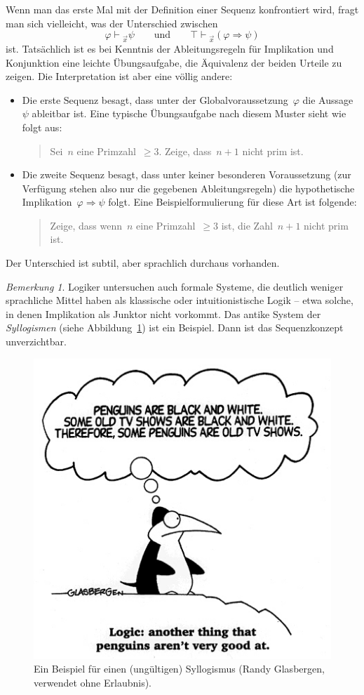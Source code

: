 \documentclass[a4paper,ngerman,12pt]{scrartcl}
\theoremstyle{definition}
\theoremstyle{plain}
\theoremstyle{remark}
\newtheorem{bem}[defn]{Bemerkung}
\newcommand{\seq}[1]{\mathrel{\vdash\!\!\!_{#1}}}
\renewcommand{\_}{\mathpunct{.}\,}
\newcommand{\?}{\,{:}\,}
\begin{document}
Wenn man das erste Mal mit der Definition einer Sequenz konfrontiert wird,
fragt man sich vielleicht, was der Unterschied zwischen
\[ \text{$\varphi \seq{\vec x} \psi$} \qquad\text{und}\qquad
  \text{$\top \seq{\vec x} (\varphi \Rightarrow \psi)$} \]
ist. Tatsächlich ist es bei Kenntnis der Ableitungsregeln für Implikation und
Konjunktion eine leichte Übungsaufgabe, die Äquivalenz der beiden Urteile zu
zeigen. Die Interpretation ist aber eine völlig andere:
\begin{itemize}
\item Die erste Sequenz besagt, dass unter der Globalvoraussetzung~$\varphi$
die Aussage~$\psi$ ableitbar ist. Eine typische Übungsaufgabe nach diesem
Muster sieht wie folgt aus:
\begin{quote}Sei~$n$ eine Primzahl~$\geq 3$. Zeige, dass~$n + 1$ nicht prim
ist.\end{quote}
\item Die zweite Sequenz besagt, dass unter keiner besonderen Voraussetzung
(zur Verfügung stehen also nur die gegebenen Ableitungsregeln) die
hypothetische Implikation~$\varphi \Rightarrow \psi$ folgt. Eine
Beispielformulierung für diese Art ist folgende:
\begin{quote}Zeige, dass wenn~$n$ eine Primzahl~$\geq 3$ ist, die Zahl~$n + 1$
nicht prim ist.\end{quote}
\end{itemize}
Der Unterschied ist subtil, aber sprachlich durchaus vorhanden.

\begin{bem}Logiker untersuchen auch formale Systeme, die deutlich weniger
sprachliche Mittel haben als klassische oder intuitionistische Logik -- etwa
solche, in denen Implikation als Junktor nicht vorkommt. Das antike System der
\emph{Syllogismen} (siehe Abbildung~\ref{penguin-logic})
ist ein Beispiel. Dann ist das Sequenzkonzept unverzichtbar.
\end{bem}
\begin{figure}
  \centering
  \includegraphics[scale=0.5]{penguin-logic}
  \caption{\label{penguin-logic}Ein Beispiel für einen (ungültigen)
  Syllogismus (Randy Glasbergen, verwendet ohne Erlaubnis).}
\end{figure}
\end{document}
